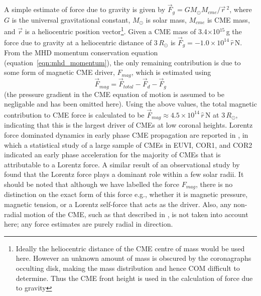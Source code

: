 A simple estimate of force due to gravity is given by $\vec{F}_{g}=GM_{\odot}M_{cme}/\vec{r}\,^2$, where $G$ is the universal gravitational constant, $M_{\odot}$ is solar mass, $M_{cme}$ is CME mass, and $\vec{r}$ is a heliocentric position vector\footnote{Ideally the heliocentric distance of the CME centre of mass would be used here. However an unknown amount of mass is obscured by the coronagraphs occulting disk, making the mass distribution and hence COM difficult to determine. Thus the CME front height is used in the calculation of force due to gravity}. Given a CME mass of 3.4$\times$10$^{15}$\,g the force due to gravity at a heliocentric distance of 3\,$R_{\odot}$ is $\vec{F}_{g}=-1.0\times10^
{14}\,\hat{r}$\,N. From the MHD momentum conservation equation (equation~\ref{eqn:mhd_momentum}), the only remaining contribution is due to some form of magnetic CME driver, $F_{mag}$, which is estimated using 
\begin{equation}
\vec{F}_{mag}= \vec{F}_{total}-\vec{F}_{d}-\vec{F}_{g}
\end{equation}
(the pressure gradient in the CME equation of motion is assumed to be negligable and has been omitted here). Using the above values, the total magnetic contribution to CME force is calculated to be $\vec{F}_{mag}\approx4.5\times10^{14}\,\hat{r}$\,N at 3\,$R_{\odot}$, indicating that this is the largest driver of CMEs at low coronal heights. Lorentz force dominated dynamics in early phase CME propagation are reported in \citet{bein2011}, in which a statistical study of a large sample of CMEs in EUVI, COR1, and COR2 indicated an early phase acceleration for the majority of CMEs that is attributable to a Lorentz force.  A similar result of an observational study by \citet{vrs06} found that the Lorentz force plays a dominant role within a few solar radii. It should be noted that although we have labelled the force $F_{mag}$, there is no distinction on the exact form of this force e.g., whether it is magnetic pressure, magnetic tension, or a Lorentz self-force that acts as the driver. Also, any non-radial motion of the CME, such as that described in \citet{byrne2010}, is not taken into account here; any force estimates are purely radial in direction.


